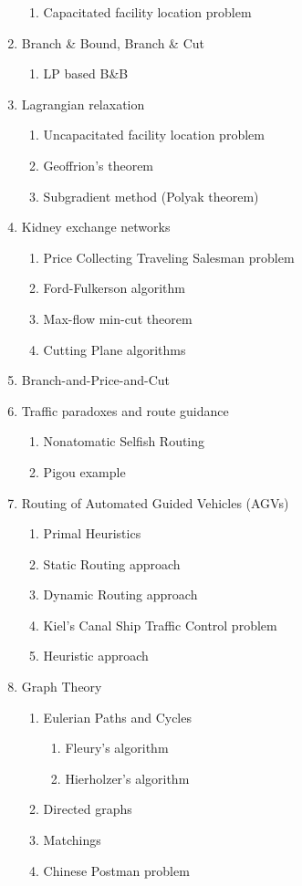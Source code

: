 \documentclass{article}
\begin{document}
\begin{enumerate}
    \begin{enumerate}
        \item Capacitated facility location problem
    \end{enumerate}
    \item Branch \& Bound, Branch \& Cut
    \begin{enumerate}
        \item LP based B\&B
    \end{enumerate}
    \item Lagrangian relaxation
    \begin{enumerate}
        \item Uncapacitated facility location problem
        \item Geoffrion's theorem
        \item Subgradient method (Polyak theorem)
    \end{enumerate}
    \item Kidney exchange networks
    \begin{enumerate}
        \item Price Collecting Traveling Salesman problem
        \item Ford-Fulkerson algorithm
        \item Max-flow min-cut theorem
        \item Cutting Plane algorithms
    \end{enumerate}
    \item Branch-and-Price-and-Cut
    \item Traffic paradoxes and route guidance
    \begin{enumerate}
        \item Nonatomatic Selfish Routing
        \item Pigou example
    \end{enumerate}
    \item Routing of Automated Guided Vehicles (AGVs)
    \begin{enumerate}
        \item Primal Heuristics
        \item Static Routing approach
        \item Dynamic Routing approach
        \item Kiel's Canal Ship Traffic Control problem
        \item Heuristic approach
    \end{enumerate}
    \item Graph Theory
    \begin{enumerate}
        \item Eulerian Paths and Cycles
        \begin{enumerate}
           \item Fleury's algorithm
           \item Hierholzer's algorithm
        \end{enumerate}
        \item Directed graphs
        \item Matchings
        \item Chinese Postman problem
    \end{enumerate}
\end{enumerate}
\end{document}
